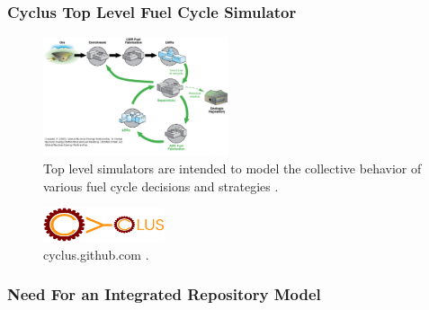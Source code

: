 


\begin{frame}[ctb!]
  \frametitle{Cyclus Top Level Fuel Cycle Simulator}
  \begin{figure}[htbp!]
    \begin{center}
      \includegraphics[height=3.5cm]{./images/simulations.eps}
    \end{center}
    \caption{Top level simulators are intended to model the collective 
    behavior of various fuel cycle decisions and 
    strategies \cite{lisowski_global_2007}.}
    \label{fig:simulation}
  \end{figure}
  \begin{figure}[htbp!]
    \begin{center}
      \includegraphics[height=1cm]{./images/cycluslogo.eps}
    \end{center}
    \caption{ cyclus.github.com \cite{huff_cyclus_2013}.}
    \label{fig:simulation}
  \end{figure}
\end{frame}

\begin{frame}[ctb!]
  \frametitle{Need For an Integrated Repository Model}

  

\end{frame}


